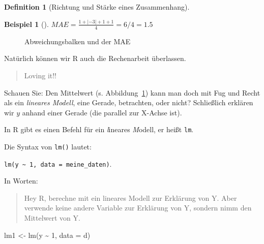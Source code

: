 \documentclass[
  a4paper,
  DIV=11]{scrreprt}
\newenvironment{Shaded}{\begin{snugshade}}{\end{snugshade}}
\newcommand{\AttributeTok}[1]{\textcolor[rgb]{0.40,0.45,0.13}{#1}}
\newcommand{\DecValTok}[1]{\textcolor[rgb]{0.68,0.00,0.00}{#1}}
\newcommand{\FunctionTok}[1]{\textcolor[rgb]{0.28,0.35,0.67}{#1}}
\newcommand{\NormalTok}[1]{\textcolor[rgb]{0.00,0.23,0.31}{#1}}
\newcommand{\OtherTok}[1]{\textcolor[rgb]{0.00,0.23,0.31}{#1}}
\newcommand{\SpecialCharTok}[1]{\textcolor[rgb]{0.37,0.37,0.37}{#1}}
\theoremstyle{definition}
\theoremstyle{definition}
\newtheorem{example}{Beispiel}[chapter]
\theoremstyle{definition}
\newtheorem{definition}{Definition}[chapter]
\theoremstyle{remark}
\begin{document}
\begin{definition}[Richtung und Stärke eines
Zusammenhang]
\begin{example}[]
\(MAE = \frac{1 + |- 3| + 1 + 1}{4} = 6/4 = 1.5\)

\end{example}

\begin{figure}


\caption{\label{fig-mae}Abweichungsbalken und der MAE}

\end{figure}%

Natürlich können wir R auch die Rechenarbeit überlassen.

\begin{quote}
{} Loving it!!
\end{quote}

Schauen Sie: Den Mittelwert (s. Abbildung~\ref{fig-mae}) kann man doch
mit Fug und Recht als ein \emph{lineares Modell}, eine Gerade,
betrachten, oder nicht? Schließlich erklären wir \(y\) anhand einer
Gerade (die parallel zur X-Achse ist).

In R gibt es einen Befehl für ein \emph{l}ineares \emph{M}odell, er
heißt \texttt{lm}.

Die Syntax von \texttt{lm()} lautet:

\texttt{lm(y\ \textasciitilde{}\ 1,\ data\ =\ meine\_daten)}.

In Worten:

\begin{quote}
Hey R, berechne mit ein lineares Modell zur Erklärung von Y. Aber
verwende keine andere Variable zur Erklärung von Y, sondern nimm den
Mittelwert von Y.
\end{quote}

\begin{Shaded}
\begin{Highlighting}[]
\NormalTok{lm1 }\OtherTok{\textless{}{-}} \FunctionTok{lm}\NormalTok{(y }\SpecialCharTok{\textasciitilde{}} \DecValTok{1}\NormalTok{, }\AttributeTok{data =}\NormalTok{ d)}
\end{Highlighting}
\end{Shaded}


\end{definition}
\end{document}
